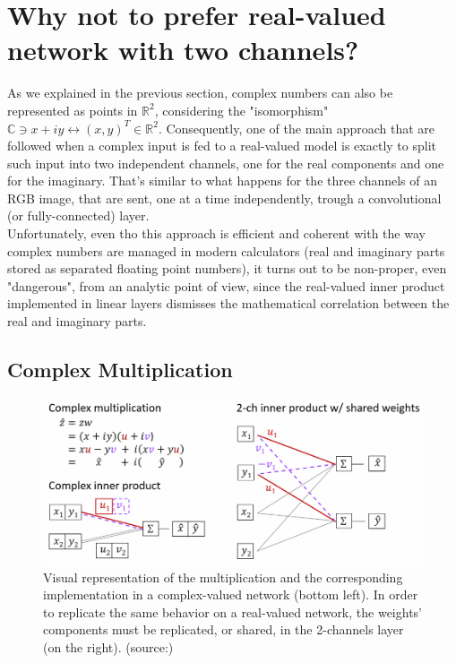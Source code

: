 \documentclass[../main.tex]{subfiles}
\begin{document}
\section{Why not to prefer real-valued network with two channels?}
As we explained in the previous section, complex numbers can also be represented as points in $\mathds{R}^2$, considering the "isomorphism" $\mathds{C}\ni x+iy \leftrightarrow (x,y)^T\in\mathds{R}^2$. Consequently, one of the main approach that are followed when a complex input is fed to a real-valued model is exactly to split such input into two independent channels, one for the real components and one for the imaginary. That's similar to what happens for the three channels of an RGB image, that are sent, one at a time independently, trough a convolutional (or fully-connected) layer.\\
Unfortunately, even tho this approach is efficient and coherent with the way complex numbers are managed in modern calculators (real and imaginary parts stored as separated floating point numbers), it turns out to be non-proper, even "dangerous", from an analytic point of view, since the real-valued inner product implemented in linear layers dismisses the mathematical correlation between the real and imaginary parts.\\
 
 
\subsection*{Complex Multiplication}
\label{subsec:cmplx_multiplication}

\begin{figure}[!ht]
	\centering
	\includegraphics[width=\textwidth]{pictures/cmplx_multiplication.pdf}
	\caption{Visual representation of the multiplication and the corresponding implementation in a complex-valued network (bottom left). In order to replicate the same behavior on a real-valued network, the weights' components must be replicated, or shared, in the 2-channels layer (on the right). (source:\cite{Virtue:EECS-2019-126})}
	\label{fig:cmplx_multiplication}
\end{figure}
\end{document}
